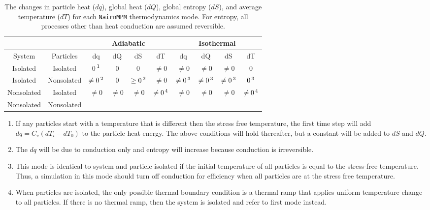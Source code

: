 \documentclass[11pt]{book}
\begin{document}
\begin{table}\renewcommand{\arraystretch}{1.2}
\caption{The changes in particle heat ($dq$), global heat ($dQ$), global entropy ($dS$), and average temperature ($dT$) for each {\tt NairnMPM} thermodynamics mode. For entropy, all processes other than heat conduction are assumed reversible.}
\vskip6pt
\label{tdmodes}
\centering
\begin{tabular}{|c|c|c|c|c|c|c|c|c|c|}
\hline
 &  & \multicolumn{4}{|c|}{Adiabatic} & \multicolumn{4}{|c|}{Isothermal} \\
\hline
System & Particles & dq & dQ & dS & dT & dq & dQ & dS & dT \\
\hline
Isolated & Isolated & 0$\thinspace^1$ & 0 & 0 & $\ne0$ & $\ne0$ & $\ne0$ & $\ne0$ & 0 \\
\hline
Isolated & Nonsolated & $\ne0\thinspace^2$ & 0 & $\ge0\thinspace^2$ & $\ne0$ &
          $\ne0\thinspace^3$ & $\ne0\thinspace^3$ & $\ne0\thinspace^3$ & $0\thinspace^3$ \\
\hline
Nonsolated & Isolated & \multirow{2}{*}{$\ne0$} & \multirow{2}{*}{$\ne0$} & \multirow{2}{*}{$\ne0$}
      & \multirow{2}{*}{$\ne0\thinspace^4$} & \multirow{2}{*}{$\ne0$} & \multirow{2}{*}{$\ne0$} & 
      \multirow{2}{*}{$\ne0$} & \multirow{2}{*}{$\ne0\thinspace^4$} \\
\cline{1-2}
Nonsolated & Nonsolated & & & & & & & &  \\
\hline
\end{tabular}
{\footnotesize
\begin{enumerate}
\item If any particles start with a temperature that is different then the stress free temperature, the first
time step will add $dq=C_v(dT_i-dT_0)$ to the particle heat energy. The above conditions will hold thereafter, but a
constant will be added to $dS$ and $dQ$.
\item The $dq$ will be due to conduction only and entropy will increase because conduction is irreversible.
\item This mode is identical to system and particle isolated if the initial temperature of all particles is equal to the stress-free temperature. Thus, a simulation in this mode should turn off conduction for efficiency when all particles
are at the stress free temperature.
\item When particles are isolated, the only possible thermal boundary condition is a thermal ramp that applies uniform temperature change to all particles. If there is no thermal ramp, then the system is isolated and refer to first mode instead.
\end{enumerate}
}
\end{table}
\end{document}
